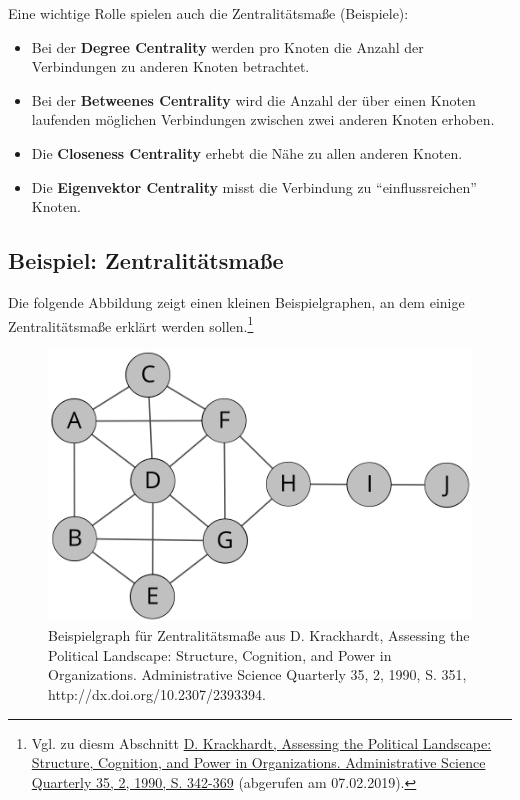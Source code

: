 \documentclass[ngerman,]{scrreprt}
\providecommand{\tightlist}{%
  \setlength{\itemsep}{0pt}\setlength{\parskip}{0pt}}
\begin{document}
Eine wichtige Rolle spielen auch die Zentralitätsmaße (Beispiele):

\begin{itemize}
\tightlist
\item
  Bei der \textbf{Degree Centrality} werden pro Knoten die Anzahl der Verbindungen zu anderen Knoten betrachtet.
\item
  Bei der \textbf{Betweenes Centrality} wird die Anzahl der über einen Knoten laufenden möglichen Verbindungen zwischen zwei anderen Knoten erhoben.
\item
  Die \textbf{Closeness Centrality} erhebt die Nähe zu allen anderen Knoten.
\item
  Die \textbf{Eigenvektor Centrality} misst die Verbindung zu ``einflussreichen'' Knoten.
\end{itemize}

\subsection{Beispiel: Zentralitätsmaße}\label{beispiel-zentralituxe4tsmauxdfe}

Die folgende Abbildung zeigt einen kleinen Beispielgraphen, an dem einige Zentralitätsmaße erklärt werden sollen.\footnote{Vgl. zu diesm Abschnitt \href{https://www.jstor.org/stable/2393394?origin=crossref\&seq=1\#metadata_info_tab_contents}{D. Krackhardt, Assessing the Political Landscape: Structure, Cognition, and Power in Organizations. Administrative Science Quarterly 35, 2, 1990, S. 342-369} (abgerufen am 07.02.2019).}

\begin{figure}
\centering
\includegraphics{Bilder/krackhardtKite.png}
\caption{Beispielgraph für Zentralitätsmaße aus D. Krackhardt, Assessing the Political Landscape: Structure, Cognition, and Power in Organizations. Administrative Science Quarterly 35, 2, 1990, S. 351, http://dx.doi.org/10.2307/2393394.}
\end{figure}
\end{document}
